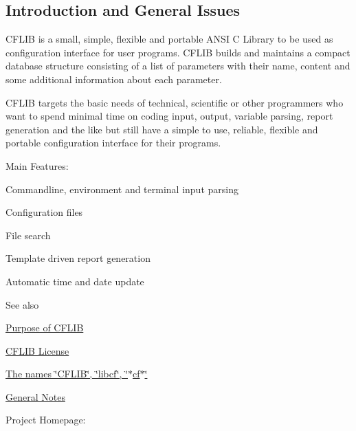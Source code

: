 \hypertarget{index_intro}{}\subsection{Introduction and General Issues}\label{index_intro}
C\-F\-L\-I\-B is a small, simple, flexible and portable A\-N\-S\-I C Library to be used as configuration interface for user programs. C\-F\-L\-I\-B builds and maintains a compact database structure consisting of a list of parameters with their name, content and some additional information about each parameter.

C\-F\-L\-I\-B targets the basic needs of technical, scientific or other programmers who want to spend minimal time on coding input, output, variable parsing, report generation and the like but still have a simple to use, reliable, flexible and portable configuration interface for their programs.

\begin{DoxyParagraph}{Main Features\-:}

\end{DoxyParagraph}

\begin{DoxyItemize}
\item Commandline, environment and terminal input parsing
\begin{DoxyItemize}
\item Configuration files
\item File search
\item Template driven report generation
\item Automatic time and date update
\end{DoxyItemize}
\end{DoxyItemize}

\begin{DoxySeeAlso}{See also}

\begin{DoxyItemize}
\item \hyperlink{purpose}{Purpose of C\-F\-L\-I\-B}
\item \hyperlink{license}{C\-F\-L\-I\-B License}
\item \hyperlink{properties_names}{The names \char`\"{}\-C\-F\-L\-I\-B\char`\"{}, \char`\"{}libcf\char`\"{}, \char`\"{}$\ast$cf$\ast$\char`\"{}}
\item \hyperlink{properties}{General Notes}
\end{DoxyItemize}
\end{DoxySeeAlso}
\begin{DoxyParagraph}{Project Homepage\-:}

\end{DoxyParagraph}

